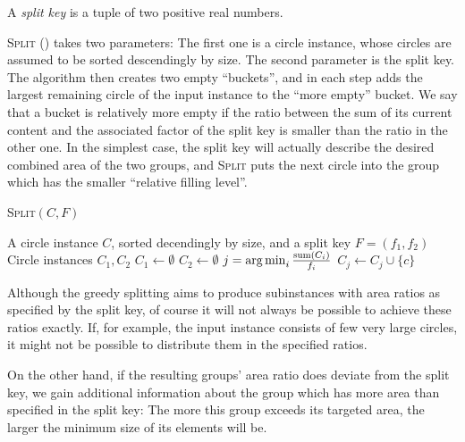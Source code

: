 \documentclass[a4paper,style=print,oneside,bibliography=totoc,nexus,lnum,extramargin]{tubsbook}
\begin{document}
\begin{definition}
    A \emph{split key} is a tuple of two positive real numbers.
\end{definition}

\textsc{Split} () takes two parameters: The first one is a circle instance, whose circles are assumed to be sorted descendingly by size. The second parameter is the split key. The algorithm then creates two empty “buckets”, and in each step adds the largest remaining circle of the input instance to the “more empty” bucket. We say that a bucket is relatively more empty if the ratio between the sum of its current content and the associated factor of the split key is smaller than the ratio in the other one.
In the simplest case, the split key will actually describe the desired combined area of the two groups, and \textsc{Split} puts the next circle into the group which has the smaller “relative filling level”.

\begin{algorithm}
    \caption{\textsc{Split}$(C,F)$}
    \label{alg:split}
    \begin{algorithmic}
        \Require A circle instance $C$, sorted decendingly by size, and a split key $F = (f_1, f_2)$
        \Ensure Circle instances $C_1, C_2$
        \State $C_1 \gets \emptyset$
        \State $C_2 \gets \emptyset$
            \State $j = \operatorname*{arg\,min}_{i} \frac{\operatorname{sum}(C_i)}{f_i}$
            \State $C_j \gets C_j \cup \{c\}$
        \EndFor
    \end{algorithmic}
\end{algorithm}

Although the greedy splitting aims to produce subinstances with area ratios as specified by the split key, of course it will not always be possible to achieve these ratios exactly. If, for example, the input instance consists of few very large circles, it might not be possible to distribute them in the specified ratios.

On the other hand, if the resulting groups' area ratio does deviate from the split key, we gain additional information about the group which has more area than specified in the split key: The more this group exceeds its targeted area, the larger the minimum size of its elements will be.
\end{document}
